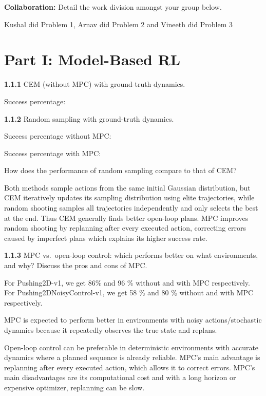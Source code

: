 \documentclass[11pt]{article}
\begin{document}
\textbf{Collaboration:} Detail the work division amongst your group below.
\begin{answer}[height=4cm]
  Kushal did Problem 1, Arnav did Problem 2 and Vineeth did Problem 3
\end{answer}

\newpage
\part*{Part I: Model-Based RL}


\textbf{1.1.1}  CEM (without MPC) with ground-truth dynamics.

Success percentage: 

\textbf{1.1.2}  Random sampling with ground-truth dynamics.

Success percentage without MPC: 

Success percentage with MPC: 

How does the performance of random sampling compare to that of CEM?
\begin{answer}[height=4cm]
  Both methods sample actions from the same initial Gaussian distribution, but CEM iteratively updates its sampling distribution using elite trajectories, while random shooting samples all trajectories independently and only selects the best at the end. Thus CEM generally finds better open-loop plans. MPC improves random shooting by replanning after every executed action, correcting errors caused by imperfect plans which explains its higher success rate.
\end{answer}

\textbf{1.1.3}  MPC vs.\ open-loop control: which performs better on what environments, and why? Discuss the pros and cons of MPC.
\begin{answer}[height=7cm]
  For Pushing2D-v1, we get 86\% and 96 \% without and with MPC respectively. For Pushing2DNoisyControl-v1, we get 58 \% and 80 \% without and with MPC respectively.

  MPC is expected to perform better in environments with noisy actions/stochastic dynamics because it repeatedly observes the true state and replans.

Open-loop control can be preferable in deterministic environments with accurate dynamics where a planned sequence is already reliable. MPC's main advantage is replanning after every executed action, which allows it to correct errors. MPC’s main disadvantages are its computational cost and with a long horizon or expensive optimizer, replanning can be slow.
\end{answer}
\end{document}
